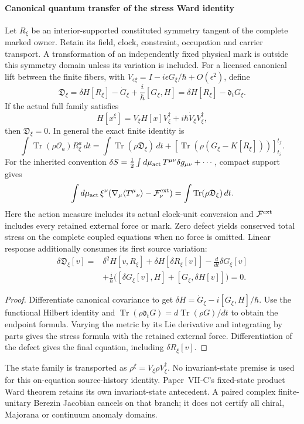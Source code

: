 \documentclass[12pt,a4paper]{article}
\begin{document}
\paragraph{Canonical quantum transfer of the stress Ward identity}
\label{p4:sec:v4106-canonical-stress-ward}
\begin{theorem}
\label{p4:thm:v4106-canonical-stress-ward}
Let $R_\xi$ be an interior-supported constituted symmetry tangent of the
complete marked owner. Retain its field, clock, constraint, occupation and
carrier transport. A transformation of an independently fixed physical mark
is outside this symmetry domain unless its variation is included.
For a licensed canonical lift between the finite fibers, with
$V_{\epsilon\xi}=I-i\epsilon G_\xi/\hbar+O(\epsilon^2)$, define
\[
 \mathfrak D_\xi=\delta H[R_\xi]-\dot G_\xi+
                     \frac{i}{\hbar}[G_\xi,H]
               =\delta H[R_\xi]-\mathfrak d_tG_\xi.
\]
If the actual full family satisfies
\[
 H[x^\xi]=V_\xi H[x]V_\xi^\dagger+i\hbar\dot V_\xi V_\xi^\dagger,
\]
then $\mathfrak D_\xi=0$. In general the exact finite identity is
\[
 \int\operatorname{Tr}(\rho\mathcal O_a)R_\xi^a\,dt
 =\int\operatorname{Tr}(\rho\mathfrak D_\xi)\,dt+
 [\operatorname{Tr}(\rho(G_\xi-K[R_\xi]))]_{t_i}^{t_f}.
\]
For the inherited convention
$\delta S=\tfrac12\int d\mu_{\rm act}\,T^{\mu\nu}\delta g_{\mu\nu}+\cdots$,
compact support gives
\[
 \int d\mu_{\rm act}\,\xi^\nu
       (\nabla_\mu\langle T^\mu{}_\nu\rangle-\mathcal F_\nu^{\rm ext})
       =\int\operatorname{Tr}(\rho\mathfrak D_\xi)\,dt.
\]
Here the action measure includes its actual clock-unit conversion and
$\mathcal F^{\rm ext}$ includes every retained external force or mark.
Zero defect yields conserved total stress on the complete coupled equations
when no force is omitted. Linear response additionally consumes its first source variation:
\begin{align*}
 \delta\mathfrak D_\xi[v]={}&\delta^2H[v,R_\xi]
       +\delta H[\delta R_\xi[v]]-\frac d{dt}\delta G_\xi[v]\\
 &+\frac{i}{\hbar}\bigl([\delta G_\xi[v],H]+[G_\xi,\delta H[v]]\bigr)=0.
\end{align*}
\end{theorem}
\begin{proof}
Differentiate canonical covariance to get
$\delta H=\dot G_\xi-i[G_\xi,H]/\hbar$.
Use the functional Hilbert identity and
$\operatorname{Tr}(\rho\mathfrak d_tG)=
d\operatorname{Tr}(\rho G)/dt$ to obtain the endpoint formula.
Varying the metric by its Lie derivative and integrating by parts gives
the stress formula with the retained external force. Differentiation of
the defect gives the final equation, including $\delta R_\xi[v]$.
\end{proof}
The state family is transported as $\rho^\xi=V_\xi\rho V_\xi^\dagger$.
No invariant-state premise is used for this on-equation source-history
identity. Paper~VII-C's fixed-state product Ward theorem retains its own
invariant-state antecedent. A paired complex finite-unitary Berezin
Jacobian cancels on that branch; it does not certify all chiral, Majorana
or continuum anomaly domains.
\end{document}
